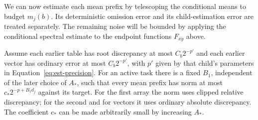 We can now estimate each mean prefix by telescoping the conditional
means to budget $m_j(b)$.  Its deterministic omission error and its
child-estimation error are treated separately.  The remaining noise
will be bounded by applying the conditional spectral estimate to the
endpoint functions $F_{xy}$ above.

\begin{lemma}\label{lem:est-mean-prefix}
Assume each earlier table has root discrepancy at most $C_b2^{-p'}$
and each earlier vector has ordinary error at most $C_b2^{-p'}$, with
$p'$ given by that child's parameters in Equation~\eqref{eq:est-precision}.
For an active task there is a fixed $B_1$, independent of the later
choice of $A_*$, such that every mean prefix has norm at most
$c_*2^{-p+B_1d_j}$ against its target.  For the first array the norm
uses clipped relative discrepancy; for the second and for vectors it uses
ordinary absolute discrepancy.  The coefficient $c_*$ can be made
arbitrarily small by increasing $A_*$.
\end{lemma}
